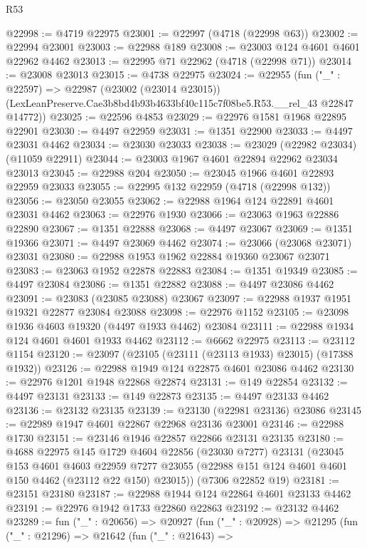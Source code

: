 \begin{lexlean}{R53}
\begin{coremodule}
@22998 := @4719 @22975
@23001 := @22997 (@4718 (@22998 @63))
@23002 := @22994 @23001
@23003 := @22988 @189
@23008 := @23003 @124 @4601 @4601 @22962 @4462
@23013 := @22995 @71 @22962 (@4718 (@22998 @71))
@23014 := @23008 @23013
@23015 := @4738 @22975
@23024 := @22955
    (fun ("_" : @22597) =>
    @22987
      (@23002 (@23014 @23015))
      (LexLeanPreserve.Cae3b8bd4b93b4633bf40c115c7f08be5.R53.__rel_43 @22847 @14772))
@23025 := @22596 @4853
@23029 := @22976 @1581 @1968 @22895 @22901
@23030 := @4497 @22959
@23031 := @1351 @22900
@23033 := @4497 @23031 @4462
@23034 := @23030 @23033
@23038 := @23029 (@22982 @23034) (@11059 @22911)
@23044 := @23003 @1967 @4601 @22894 @22962 @23034 @23013
@23045 := @22988 @204
@23050 := @23045 @1966 @4601 @22893 @22959 @23033
@23055 := @22995 @132 @22959 (@4718 (@22998 @132))
@23056 := @23050 @23055
@23062 := @22988 @1964 @124 @22891 @4601 @23031 @4462
@23063 := @22976 @1930
@23066 := @23063 @1963 @22886 @22890
@23067 := @1351 @22888
@23068 := @4497 @23067
@23069 := @1351 @19366
@23071 := @4497 @23069 @4462
@23074 := @23066 (@23068 @23071) @23031
@23080 := @22988 @1953 @1962 @22884 @19360 @23067 @23071
@23083 := @23063 @1952 @22878 @22883
@23084 := @1351 @19349
@23085 := @4497 @23084
@23086 := @1351 @22882
@23088 := @4497 @23086 @4462
@23091 := @23083 (@23085 @23088) @23067
@23097 := @22988 @1937 @1951 @19321 @22877 @23084 @23088
@23098 := @22976 @1152
@23105 := @23098 @1936 @4603 @19320 (@4497 @1933 @4462) @23084
@23111 := @22988 @1934 @124 @4601 @4601 @1933 @4462
@23112 := @6662 @22975
@23113 := @23112 @1154
@23120 := @23097 (@23105 (@23111 (@23113 @1933) @23015) (@17388 @1932))
@23126 := @22988 @1949 @124 @22875 @4601 @23086 @4462
@23130 := @22976 @1201 @1948 @22868 @22874
@23131 := @149 @22854
@23132 := @4497 @23131
@23133 := @149 @22873
@23135 := @4497 @23133 @4462
@23136 := @23132 @23135
@23139 := @23130 (@22981 @23136) @23086
@23145 := @22989 @1947 @4601 @22867 @22968 @23136 @23001
@23146 := @22988 @1730
@23151 := @23146 @1946 @22857 @22866 @23131 @23135
@23180 := @4688
    @22975
    @145
    @1729
    @4604
    @22856
    (@23030 @7277)
    @23131
    (@23045
      @153
      @4601
      @4603
      @22959
      @7277
      @23055
      (@22988 @151 @124 @4601 @4601 @150 @4462 (@23112 @22 @150) @23015))
    (@7306 @22852 @19)
@23181 := @23151 @23180
@23187 := @22988 @1944 @124 @22864 @4601 @23133 @4462
@23191 := @22976 @1942 @1733 @22860 @22863
@23192 := @23132 @4462
@23289 := fun ("_" : @20656) =>
  @20927
    (fun ("_" : @20928) =>
    @21295
      (fun ("_" : @21296) =>
      @21642
        (fun ("_" : @21643) =>

\end{coremodule}
\end{lexlean}
